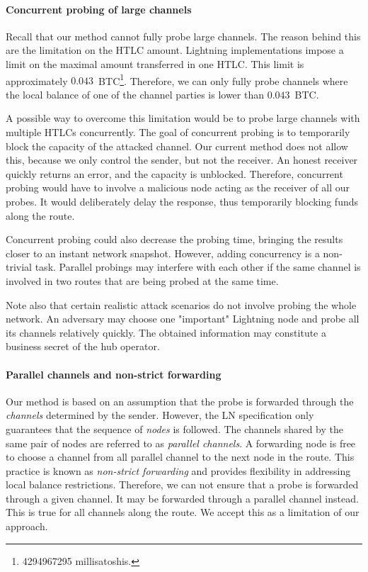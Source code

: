 \paragraph{Concurrent probing of large channels}

Recall that our method cannot fully probe large channels.
The reason behind this are the limitation on the HTLC amount.
Lightning implementations impose a limit on the maximal amount transferred in one HTLC.
This limit is approximately $0.043$~BTC\footnote{4294967295 millisatoshis.}.
Therefore, we can only fully probe channels where the local balance of one of the channel parties is lower than $0.043$~BTC.

A possible way to overcome this limitation would be to probe large channels with multiple HTLCs concurrently.
The goal of concurrent probing is to temporarily block the capacity of the attacked channel.
Our current method does not allow this, because we only control the sender, but not the receiver.
An honest receiver quickly returns an error, and the capacity is unblocked.
Therefore, concurrent probing would have to involve a malicious node acting as the receiver of all our probes.
It would deliberately delay the response, thus temporarily blocking funds along the route.

Concurrent probing could also decrease the probing time, bringing the results closer to an instant network snapshot.
However, adding concurrency is a non-trivial task.
Parallel probings may interfere with each other if the same channel is involved in two routes that are being probed at the same time.

Note also that certain realistic attack scenarios do not involve probing the whole network.
An adversary may choose one "important" Lightning node and probe all its channels relatively quickly.
The obtained information may constitute a business secret of the hub operator.


\paragraph{Parallel channels and non-strict forwarding}

Our method is based on an assumption that the probe is forwarded through the \textit{channels} determined by the sender.
However, the LN specification only guarantees that the sequence of \textit{nodes} is followed.
The channels shared by the same pair of nodes are referred to as \textit{parallel channels}.
A forwarding node is free to choose a channel from all parallel channel to the next node in the route.
This practice is known as \textit{non-strict forwarding} and provides flexibility in addressing local balance restrictions.
Therefore, we can not ensure that a probe is forwarded through a given channel.
It may be forwarded through a parallel channel instead.
This is true for all channels along the route.
We accept this as a limitation of our approach.

